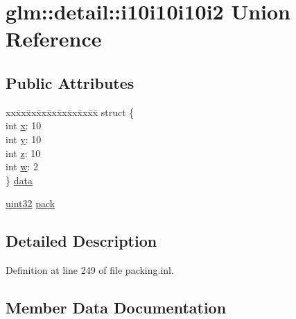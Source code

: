 \hypertarget{unionglm_1_1detail_1_1i10i10i10i2}{}\section{glm\+::detail\+::i10i10i10i2 Union Reference}
\label{unionglm_1_1detail_1_1i10i10i10i2}
\subsection*{Public Attributes}
\begin{DoxyCompactItemize}
\item 
\begin{tabbing}
xx\=xx\=xx\=xx\=xx\=xx\=xx\=xx\=xx\=\kill
struct \{\\
\>int \mbox{\hyperlink{unionglm_1_1detail_1_1i10i10i10i2_a290d519ee2feaba6ae4b5244d5d90e7b}{x}}: 10\\
\>int \mbox{\hyperlink{unionglm_1_1detail_1_1i10i10i10i2_ae76bb89adeb66d1ee5bb2b265e87fc1b}{y}}: 10\\
\>int \mbox{\hyperlink{unionglm_1_1detail_1_1i10i10i10i2_a95398090414de32eaaf9cb3c3bd3fa48}{z}}: 10\\
\>int \mbox{\hyperlink{unionglm_1_1detail_1_1i10i10i10i2_a20c12acbdb874a476b158164acd17abd}{w}}: 2\\
\} \mbox{\hyperlink{unionglm_1_1detail_1_1i10i10i10i2_ab4c1d4602d19f6bdfdf850ff892cd0c7}{data}}\\

\end{tabbing}\item 
\mbox{\hyperlink{namespaceglm_1_1detail_ade6cfbf377022aaa391af8cd50489222}{uint32}} \mbox{\hyperlink{unionglm_1_1detail_1_1i10i10i10i2_a24e2dc324c86589d568dc330904c859a}{pack}}
\end{DoxyCompactItemize}


\subsection{Detailed Description}


Definition at line 249 of file packing.\+inl.



\subsection{Member Data Documentation}
\mbox{\label{unionglm_1_1detail_1_1i10i10i10i2_ab4c1d4602d19f6bdfdf850ff892cd0c7}} 
